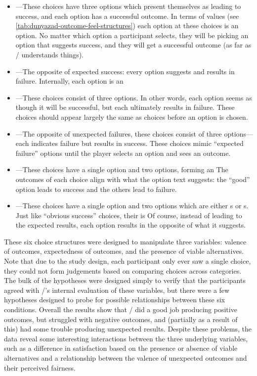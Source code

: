 \begin{itemize}
  \item {}---These choices have three options which present themselves as leading to success, and each option has a successful outcome. In terms of  values (see \cref{tab:dunyazad-outcome-feel-structures}) each option at these choices is an \exps{} option. No matter which option a participant selects, they will be picking an option that suggests success, and they will get a successful outcome (as far as \dunyazad/ understands things).
  \item {}---The opposite of expected success: every option suggests and results in failure. Internally, each option is an 
  \item {}---These choices consist of three  options. In other words, each option seems as though it will be successful, but each ultimately results in failure. These choices should appear largely the same as \exps{} choices before an option is chosen.
  \item {}---The opposite of unexpected failures, these choices consist of three  options---each indicates failure but results in success. These choices mimic ``expected failure'' options until the player selects an option and sees an outcome.
  \item {}---These choices have a single \exps{} option and two \expf{} options, forming an \obv{}  The outcomes of each choice align with what the option text suggests: the ``good'' option leads to success and the others lead to failure.
  \item {}---These choices have a single  option and two options which are either s or s. Just like ``obvious success'' choices, their  is  Of course, instead of leading to the expected results, each option results in the opposite of what it suggests.
\end{itemize}

These six choice structures were designed to manipulate three variables: valence of outcomes, expectedness of outcomes, and the presence of viable alternatives.
%
Note that due to the study design, each participant only ever saw a single choice, they could not form judgements based on comparing choices across categories.
%
The bulk of the hypotheses were designed simply to verify that the participants agreed with \dunyazad/'s internal evaluation of these variables, but there were a few hypotheses designed to probe for possible relationships between these six conditions.
%
Overall the results show that \dunyazad/ did a good job producing positive outcomes, but struggled with negative outcomes, and (partially as a result of this) had some trouble producing unexpected results.
%
Despite these problems, the data reveal some interesting interactions between the three underlying variables, such as a difference in satisfaction based on the presence or absence of viable alternatives and a relationship between the valence of unexpected outcomes and their perceived fairness.



